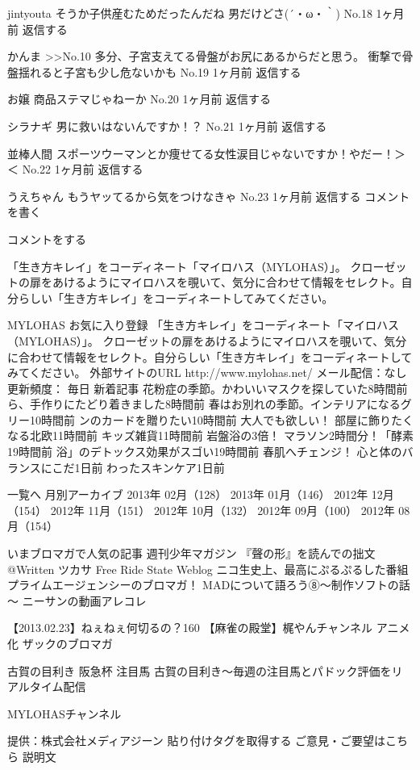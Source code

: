 jintyouta 
そうか子供産むためだったんだね
男だけどさ(´・ω・｀) 
No.18
1ヶ月前
返信する
 
かんま 
>>No.10
多分、子宮支えてる骨盤がお尻にあるからだと思う。
衝撃で骨盤揺れると子宮も少し危ないかも 
No.19
1ヶ月前
返信する
 
お嬢 
商品ステマじゃねーか 
No.20
1ヶ月前
返信する
 
シラナギ 
男に救いはないんですか！？ 
No.21
1ヶ月前
返信する
 
並棒人間 
スポーツウーマンとか痩せてる女性涙目じゃないですか！やだー！＞＜ 
No.22
1ヶ月前
返信する
 
うえちゃん 
もうヤッてるから気をつけなきゃ
No.23
1ヶ月前
返信する
コメントを書く
 
コメントをする  
 
「生き方キレイ」をコーディネート「マイロハス（MYLOHAS）」。
クローゼットの扉をあけるようにマイロハスを覗いて、気分に合わせて情報をセレクト。自分らしい「生き方キレイ」をコーディネートしてみてください。 
 
MYLOHAS 
お気に入り登録
「生き方キレイ」をコーディネート「マイロハス（MYLOHAS）」。 クローゼットの扉をあけるようにマイロハスを覗いて、気分に合わせて情報をセレクト。自分らしい「生き方キレイ」をコーディネートしてみてください。
外部サイトのURL
http://www.mylohas.net/
メール配信：なし   
更新頻度： 毎日 
新着記事
花粉症の季節。かわいいマスクを探していた8時間前
ら、手作りにたどり着きました8時間前
春はお別れの季節。インテリアになるグリー10時間前
ンのカードを贈りたい10時間前
大人でも欲しい！ 部屋に飾りたくなる北欧11時間前
キッズ雑貨11時間前
岩盤浴の3倍！ マラソン2時間分！「酵素19時間前
浴」のデトックス効果がスゴい19時間前
春肌へチェンジ！ 心と体のバランスにこだ1日前
わったスキンケア1日前

一覧へ
月別アーカイブ
2013年 02月（128） 
2013年 01月（146） 
2012年 12月（154） 
2012年 11月（151） 
2012年 10月（132） 
2012年 09月（100） 
2012年 08月（154） 

いまブロマガで人気の記事
週刊少年マガジン 『聲の形』を読んでの拙文 @Written ツカサ
Free Ride State Weblog
ニコ生史上、最高にぷるぷるした番組
プライムエージェンシーのブロマガ！
MADについて語ろう⑧～制作ソフトの話～
ニーサンの動画アレコレ
 
【2013.02.23】ねぇねぇ何切るの？160
【麻雀の殿堂】梶やんチャンネル
アニメ化
ザックのブロマガ
 
古賀の目利き 阪急杯 注目馬
古賀の目利き～毎週の注目馬とパドック評価をリアルタイム配信
   
MYLOHASチャンネル

提供：株式会社メディアジーン
貼り付けタグを取得する
ご意見・ご要望はこちら
説明文

